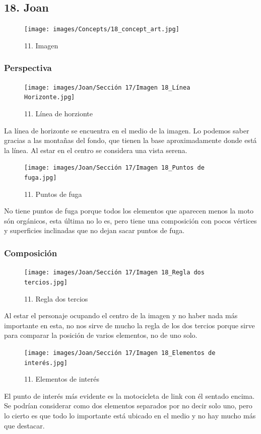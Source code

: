 \documentclass[12pt]{article}
\begin{document}
    \subsection{18. Joan}
        \begin{figure}[H]
          \centering
          \texttt{[image: images/Concepts/18\_concept\_art.jpg]}
          \caption{\small 11. Imagen}
        \end{figure}

            \subsubsection{Perspectiva}
            \begin{figure}[H]
          \centering
          \texttt{[image: images/Joan/Sección 17/Imagen 18\_Línea Horizonte.jpg]}
          \caption{\small 11. Línea de horzionte}
        \end{figure}
        La línea de horizonte se encuentra en el medio de la imagen. Lo podemos saber gracias a las montañas del fondo, que tienen la base aproximadamente donde está la línea. 
    Al estar en el centro se considera una vista serena. 

        \begin{figure}[H]
          \centering
          \texttt{[image: images/Joan/Sección 17/Imagen 18\_Puntos de fuga.jpg]}
          \caption{\small 11. Puntos de fuga}
        \end{figure}
        No tiene puntos de fuga porque todos los elementos que aparecen menos la moto són orgánicos, esta última no lo es, pero tiene una composición con pocos vértices y superficies inclinadas que no dejan sacar puntos de fuga. 

            \subsubsection{Composición}
            \begin{figure}[H]
          \centering
          \texttt{[image: images/Joan/Sección 17/Imagen 18\_Regla dos tercios.jpg]}
          \caption{\small 11. Regla dos tercios}
        \end{figure}
        Al estar el personaje ocupando el centro de la imagen y no haber nada más importante en esta, no nos sirve de mucho la regla de los dos tercios porque sirve para comparar la posición de varios elementos, no de uno solo. 

        \begin{figure}[H]
          \centering
          \texttt{[image: images/Joan/Sección 17/Imagen 18\_Elementos de interés.jpg]}
          \caption{\small 11. Elementos de interés}
        \end{figure}
        El punto de interés más evidente es la motocicleta de link con él sentado encima. Se podrían considerar como dos elementos separados por no decir solo uno, pero lo cierto es que todo lo importante está ubicado en el medio y no hay mucho más que destacar. 
\end{document}
